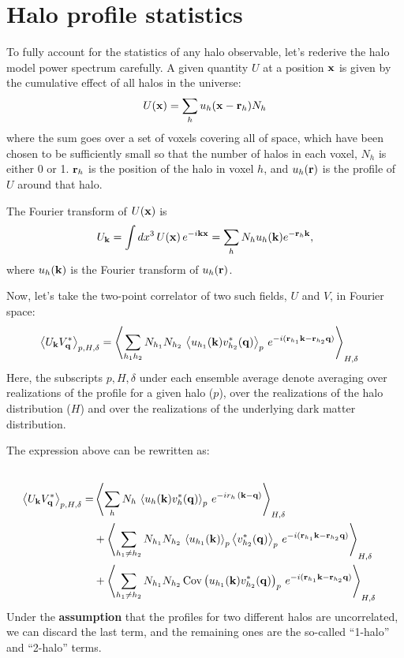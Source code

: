 \documentclass{article}
\begin{document}
\appendix
\section{Halo profile statistics}\label{app:hm}
  To fully account for the statistics of any halo observable, let's rederive the halo model power spectrum carefully. A given quantity $U$ at a position ${\bf x}$ is given by the cumulative effect of all halos in the universe:
  \begin{equation}
    U({\bf x})=\sum_h u_h({\bf x}-{\bf r}_h)N_h
  \end{equation}
  where the sum goes over a set of voxels covering all of space, which have been chosen to be sufficiently small so that the number of halos in each voxel, $N_h$ is either 0 or 1. ${\bf r}_h$ is the position of the halo in voxel $h$, and $u_h({\bf r})$ is the profile of $U$ around that halo.

  The Fourier transform of $U({\bf x})$ is
  \begin{align}\nonumber
    U_{\bf k}=\int dx^3\,U({\bf x})\,e^{-i{\bf k}{\bf x}}=\sum_h N_h u_h({\bf k}) e^{-{\bf r}_h{\bf k}},
  \end{align}
  where $u_h({\bf k})$ is the Fourier transform of $u_h({\bf r})$.

  Now, let's take the two-point correlator of two such fields, $U$ and $V$, in Fourier space:
  \begin{align}
    \left\langle U_{\bf k}V^*_{\bf q}\right\rangle_{p,H,\delta}&=\left\langle\sum_{h_1h_2}N_{h_1}N_{h_2}\,\left\langle u_{h_1}({\bf k})v^*_{h_2}({\bf q})\right\rangle_p\,e^{-i({\bf r}_{h_1}{\bf k}-{\bf r}_{h_2}{\bf q})}\right\rangle_{H,\delta}
  \end{align}
  Here, the subscripts $p,H,\delta$ under each ensemble average denote averaging over realizations of the profile for a given halo ($p$), over the realizations of the halo distribution ($H$) and over the realizations of the underlying dark matter distribution.

  The expression above can be rewritten as:
  \begin{align}\\
    \left\langle U_{\bf k}V^*_{\bf q}\right\rangle_{p,H,\delta}=&\left\langle\sum_h N_h\,\left\langle u_h({\bf k})v^*_h({\bf q})\right\rangle_p\,e^{-ir_h\,({\bf k}-{\bf q})}\right\rangle_{H,\delta}\\
    &+\left\langle\sum_{h_1\neq h_2}N_{h_1}N_{h_2}\,\left\langle u_{h_1}({\bf k})\right\rangle_p\left\langle v^*_{h_2}({\bf q})\right\rangle_p\,e^{-i({\bf r}_{h_1}{\bf k}-{\bf r}_{h_2}{\bf q})}\right\rangle_{H,\delta}\\
    &+\left\langle\sum_{h_1\neq h_2}N_{h_1}N_{h_2}\,{\rm Cov}\left(u_{h_1}({\bf k})v^*_{h_2}({\bf q})\right)_p\,e^{-i({\bf r}_{h_1}{\bf k}-{\bf r}_{h_2}{\bf q})}\right\rangle_{H,\delta}
  \end{align}
  Under the {\bf assumption} that the profiles for two different halos are uncorrelated, we can discard the last term, and the remaining ones are the so-called ``1-halo'' and ``2-halo'' terms.
\end{document}
